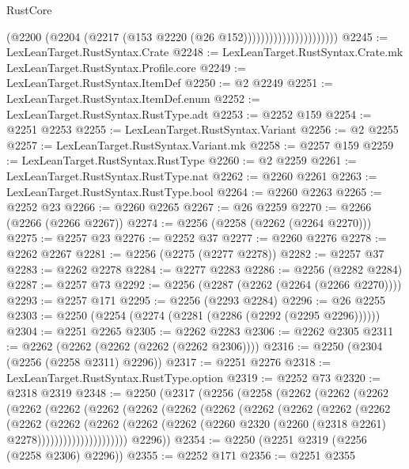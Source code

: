 \begin{lexlean}{RustCore}
\begin{coremodule}
                                      (@2200
                                        (@2204 (@2217 (@153 @2220 (@26 @152))))))))))))))))))))))
@2245 := LexLeanTarget.RustSyntax.Crate
@2248 := LexLeanTarget.RustSyntax.Crate.mk LexLeanTarget.RustSyntax.Profile.core
@2249 := LexLeanTarget.RustSyntax.ItemDef
@2250 := @2 @2249
@2251 := LexLeanTarget.RustSyntax.ItemDef.enum
@2252 := LexLeanTarget.RustSyntax.RustType.adt
@2253 := @2252 @159
@2254 := @2251 @2253
@2255 := LexLeanTarget.RustSyntax.Variant
@2256 := @2 @2255
@2257 := LexLeanTarget.RustSyntax.Variant.mk
@2258 := @2257 @159
@2259 := LexLeanTarget.RustSyntax.RustType
@2260 := @2 @2259
@2261 := LexLeanTarget.RustSyntax.RustType.nat
@2262 := @2260 @2261
@2263 := LexLeanTarget.RustSyntax.RustType.bool
@2264 := @2260 @2263
@2265 := @2252 @23
@2266 := @2260 @2265
@2267 := @26 @2259
@2270 := @2266 (@2266 (@2266 @2267))
@2274 := @2256 (@2258 (@2262 (@2264 @2270)))
@2275 := @2257 @23
@2276 := @2252 @37
@2277 := @2260 @2276
@2278 := @2262 @2267
@2281 := @2256 (@2275 (@2277 @2278))
@2282 := @2257 @37
@2283 := @2262 @2278
@2284 := @2277 @2283
@2286 := @2256 (@2282 @2284)
@2287 := @2257 @73
@2292 := @2256 (@2287 (@2262 (@2264 (@2266 @2270))))
@2293 := @2257 @171
@2295 := @2256 (@2293 @2284)
@2296 := @26 @2255
@2303 := @2250 (@2254 (@2274 (@2281 (@2286 (@2292 (@2295 @2296))))))
@2304 := @2251 @2265
@2305 := @2262 @2283
@2306 := @2262 @2305
@2311 := @2262 (@2262 (@2262 (@2262 (@2262 @2306))))
@2316 := @2250 (@2304 (@2256 (@2258 @2311) @2296))
@2317 := @2251 @2276
@2318 := LexLeanTarget.RustSyntax.RustType.option
@2319 := @2252 @73
@2320 := @2318 @2319
@2348 := @2250
    (@2317
      (@2256
        (@2258
          (@2262
            (@2262
              (@2262
                (@2262
                  (@2262
                    (@2262
                      (@2262
                        (@2262
                          (@2262
                            (@2262
                              (@2262
                                (@2262
                                  (@2262
                                    (@2262
                                      (@2262
                                        (@2262
                                          (@2262
                                            (@2262
                                              (@2260
                                                @2320
                                                (@2260 (@2318 @2261) @2278)))))))))))))))))))))
        @2296))
@2354 := @2250 (@2251 @2319 (@2256 (@2258 @2306) @2296))
@2355 := @2252 @171
@2356 := @2251 @2355

\end{coremodule}
\end{lexlean}
